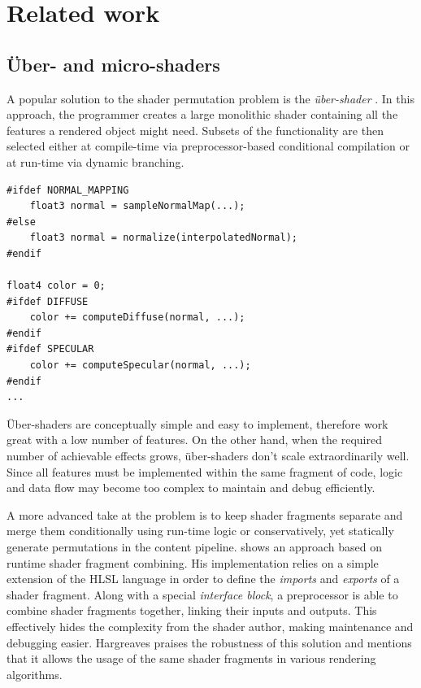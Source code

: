 
\chapter{ Related work }
\label{Chapter3}

\section{Über- and micro-shaders}

A popular solution to the shader permutation problem is the \emph{ über-shader }. In this approach, the programmer creates a large monolithic shader containing all the features a rendered object might need. Subsets of the functionality are then selected either at compile-time via preprocessor-based conditional compilation or at run-time via dynamic branching.

\begin{lstlisting}[frame=single]
#ifdef NORMAL_MAPPING
    float3 normal = sampleNormalMap(...);
#else
    float3 normal = normalize(interpolatedNormal);
#endif

float4 color = 0;
#ifdef DIFFUSE
    color += computeDiffuse(normal, ...);
#endif
#ifdef SPECULAR
    color += computeSpecular(normal, ...);
#endif
...
\end{lstlisting}

Über-shaders are conceptually simple and easy to implement, therefore work great with a low number of features. On the other hand, when the required number of achievable effects grows, über-shaders don't scale extraordinarily well. Since all features must be implemented within the same fragment of code, logic and data flow may become too complex to maintain and debug efficiently.

A more advanced take at the problem is to keep shader fragments separate and merge them conditionally using run-time logic or conservatively, yet statically generate permutations in the content pipeline. \citet{Hargreaves04} shows an approach based on runtime shader fragment combining. His implementation relies on a simple extension of the HLSL language in order to define the \emph{imports} and \emph{exports} of a shader fragment. Along with a special \emph{interface block}, a preprocessor is able to combine shader fragments together, linking their inputs and outputs. This effectively hides the complexity from the shader author, making maintenance and debugging easier. Hargreaves praises the robustness of this solution and mentions that it allows the usage of the same shader fragments in various rendering algorithms.

